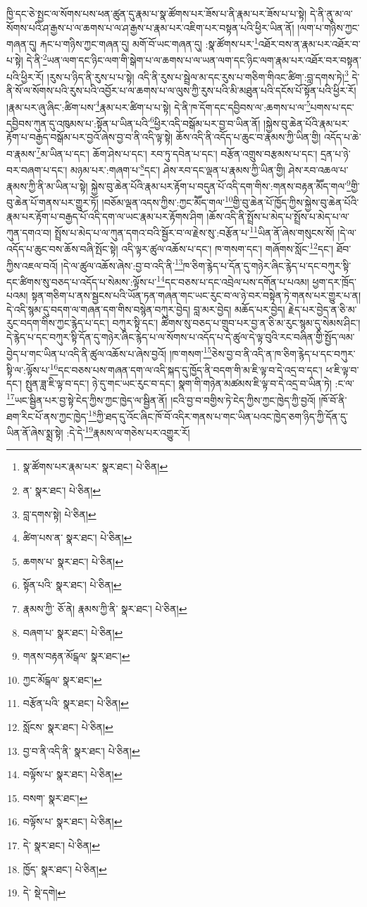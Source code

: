 ཁྱི་དང་ཅེ་སྤྱང་ལ་སོགས་པས་ཕན་ཚུན་དུ་རྣམ་པ་སྣ་ཚོགས་པར་ཟོས་པ་ནི་རྣམ་པར་ཟོས་པ་པ་སྟེ། དེ་ནི་ནུ་མ་ལ་སོགས་པའི་ཤ་རྒྱས་པ་ལ་ཆགས་པ་ལ་ཤ་རྒྱས་པ་རྣམ་པར་འཇིག་པར་བསྟན་པའི་ཕྱིར་ཡིན་ནོ། །ལག་པ་གཉིས་ཀྱང་གཞན་དུ། རྐང་པ་གཉིས་ཀྱང་གཞན་དུ། མགོ་བོ་ཡང་གཞན་དུ། :སྣ་ཚོགས་པར་\footnote{སྣ་ཚོགས་པར་རྣམ་པར་  སྣར་ཐང་།  པེ་ཅིན། }འཐོར་བས་ན་རྣམ་པར་འཐོར་བ་པ་སྟེ། དེ་ནི་\footnote{ན་  སྣར་ཐང་།  པེ་ཅིན། }ཡན་ལག་དང་ཉིང་ལག་གི་སྒེག་པ་ལ་ཆགས་པ་ལ་ཡན་ལག་དང་ཉིང་ལག་རྣམ་པར་འཐོར་བར་བསྟན་པའི་ཕྱིར་རོ། །རུས་པ་ཉིད་ནི་རུས་པ་པ་སྟེ། འདི་ནི་རུས་པ་སྦྲེལ་མ་དང་རུས་པ་གཅིག་གིའང་ཚིག་:བླ་དགས་ཏེ།\footnote{བླ་དགས་སྟེ།  པེ་ཅིན། } དེ་ནི་སོ་ལ་སོགས་པའི་རུས་པའི་འབྱོར་པ་ལ་ཆགས་པ་ལ་ལུས་ཀྱི་རུས་པའི་མི་མཐུན་པའི་དངོས་པོ་སྟོན་པའི་ཕྱིར་རོ། །རྣམ་པར་ཞུ་ཞིང་:ཚིག་པས་\footnote{ཚིག་པས་ན་  སྣར་ཐང་།  པེ་ཅིན། }རྣམ་པར་ཚིག་པ་པ་སྟེ། དེ་ནི་ཁ་དོག་དང་དབྱིབས་ལ་:ཆགས་པ་ལ་\footnote{ཆགས་པ་  སྣར་ཐང་།  པེ་ཅིན། }པགས་པ་དང་དབྱིབས་ཀུན་དུ་འཁུམས་པ་:སྟོན་པ་ཡིན་པའི་\footnote{སྟོན་པའི་  སྣར་ཐང་།  པེ་ཅིན། }ཕྱིར་འདི་བསྒོམ་པར་བྱ་བ་ཡིན་ནོ། །སྐྱེས་བུ་ཆེན་པོའི་རྣམ་པར་རྟོག་པ་བརྒྱད་བསྒོམ་པར་བྱའོ་ཞེས་བྱ་བ་ནི་འདི་ལྟ་སྟེ། ཆོས་འདི་ནི་འདོད་པ་ཆུང་བ་རྣམས་ཀྱི་ཡིན་གྱི། འདོད་པ་ཆེ་བ་རྣམས་\footnote{རྣམས་ཀྱི་  ཅོ་ནེ། རྣམས་ཀྱི་ནི་  སྣར་ཐང་།  པེ་ཅིན། }མ་ཡིན་པ་དང་། ཆོག་ཤེས་པ་དང་། རབ་ཏུ་དབེན་པ་དང་། བརྩོན་འགྲུས་བརྩམས་པ་དང་། དྲན་པ་ཉེ་བར་བཞག་པ་དང་། མཉམ་པར་:གཞག་པ་\footnote{བཞག་པ་  སྣར་ཐང་།  པེ་ཅིན། }དང་། ཤེས་རབ་དང་ལྡན་པ་རྣམས་ཀྱི་ཡིན་གྱི། ཤེས་རབ་འཆལ་པ་རྣམས་ཀྱི་ནི་མ་ཡིན་པ་སྟེ། སྐྱེས་བུ་ཆེན་པོའི་རྣམ་པར་རྟོག་པ་བདུན་པོ་འདི་དག་གིས་:གནས་བརྟན་མཽད་གལ་\footnote{གནས་བརྟན་མོངྒལ་  སྣར་ཐང་། }གྱི་བུ་ཆེན་པོ་གནས་པར་གྱུར་ཏོ། །བཅོམ་ལྡན་འདས་ཀྱིས་:ཀྱང་མཽད་གལ་\footnote{ཀྱང་མོངྒལ་  སྣར་ཐང་། }གྱི་བུ་ཆེན་པོ་ཁྱོད་ཀྱིས་སྐྱེས་བུ་ཆེན་པོའི་རྣམ་པར་རྟོག་པ་བརྒྱད་པོ་འདི་དག་ལ་ཡང་རྣམ་པར་རྟོགས་ཤིག །ཆོས་འདི་ནི་སྤྲོས་པ་མེད་པ་སྤྲོས་པ་མེད་པ་ལ་ཀུན་དགའ་བ། སྤྲོས་པ་མེད་པ་ལ་ཀུན་དགའ་བའི་སྦྱོར་བ་ལ་རྗེས་སུ་:བརྩོན་པ་\footnote{བརྩོན་པའི་  སྣར་ཐང་།  པེ་ཅིན། }ཡིན་ནོ་ཞེས་གསུངས་སོ། །དེ་ལ་འདོད་པ་ཆུང་བས་ཆོས་བཞི་སྤོང་སྟེ། འདི་ལྟར་ཚུལ་འཆོས་པ་དང་། ཁ་གསག་དང་། གཞོགས་སློང་\footnote{སློངས་  སྣར་ཐང་།  པེ་ཅིན། }དང་། ཐོབ་ཀྱིས་འཇལ་བའོ། །དེ་ལ་ཚུལ་འཆོས་ཞེས་:བྱ་བ་འདི་ནི་\footnote{བྱ་བ་ནི་འདི་ནི་  སྣར་ཐང་།  པེ་ཅིན། }ཁ་ཅིག་རྙེད་པ་དོན་དུ་གཉེར་ཞིང་རྙེད་པ་དང་བཀུར་སྟི་དང་ཚིགས་སུ་བཅད་པ་འདོད་པ་སེམས་:ལྟོས་པ་\footnote{བལྟོས་པ་  སྣར་ཐང་།  པེ་ཅིན། }དང་བཅས་པ་དང་འབྲེལ་པས་དགོན་པ་པའམ། ཕྱག་དར་ཁྲོད་པའམ། སྟན་གཅིག་པ་ནས་སྦྱངས་པའི་ཡོན་ཏན་གཞན་གང་ཡང་རུང་བ་ལ་ཉེ་བར་བསྟེན་ཏེ་གནས་པར་གྱུར་པ་ན། དེ་འདི་སྙམ་དུ་བདག་ལ་གཞན་དག་གིས་བསྙེན་བཀུར་བྱེད། བླ་མར་བྱེད། མཆོད་པར་བྱེད། རྗེད་པར་བྱེད་ན་ཅི་མ་རུང་བདག་གིས་ཀྱང་རྙེད་པ་དང་། བཀུར་སྟི་དང་། ཚིགས་སུ་བཅད་པ་གྲུབ་པར་བྱ་ན་ཅི་མ་རུང་སྙམ་དུ་སེམས་ཤིང་། དེ་རྙེད་པ་དང་བཀུར་སྟི་དོན་དུ་གཉེར་ཞིང་རྙེད་པ་ལ་སོགས་པ་འདོད་པ་དེ་ཚུལ་དེ་ལྟ་བུའི་རང་བཞིན་གྱི་སྤྱོད་ལམ་བྱེད་པ་གང་ཡིན་པ་འདི་ནི་ཚུལ་འཆོས་པ་ཞེས་བྱའོ། །ཁ་གསག་\footnote{བསག་  སྣར་ཐང་། }ཅེས་བྱ་བ་ནི་འདི་ན་ཁ་ཅིག་རྙེད་པ་དང་བཀུར་སྟི་ལ་:ལྟོས་པ་\footnote{བལྟོས་པ་  སྣར་ཐང་།  པེ་ཅིན། }དང་བཅས་པས་གཞན་དག་ལ་འདི་སྐད་དུ་ཁྱོད་ནི་བདག་གི་མ་ཇི་ལྟ་བ་དེ་འདྲ་བ་དང་། ཕ་ཇི་ལྟ་བ་དང་། སྤུན་ཟླ་ཇི་ལྟ་བ་དང་། ཉེ་དུ་གང་ཡང་རུང་བ་དང་། སྣག་གི་གཉེན་མཚམས་ཇི་ལྟ་བ་དེ་འདྲ་བ་ཡིན་ཏེ། :ང་ལ་\footnote{དེ་  སྣར་ཐང་།  པེ་ཅིན། }ཡང་སྦྱིན་པར་བྱ་སྟེ་ངེད་ཀྱིས་ཀྱང་ཁྱེད་ལ་སྦྱིན་ནོ། །ངའི་བྱ་བ་བགྱིས་ཏེ་ངེད་ཀྱིས་ཀྱང་ཁྱེད་ཀྱི་བྱའོ། །ཁོ་བོ་ནི་ཐག་རིང་པོ་ནས་ཀྱང་ཁྱེད་\footnote{ཁྱོད་  སྣར་ཐང་།  པེ་ཅིན། }ཀྱི་ཐད་དུ་འོང་ཞིང་ཁོ་བོ་འདིར་གནས་པ་གང་ཡིན་པའང་ཁྱེད་ཅག་ཉིད་ཀྱི་དོན་དུ་ཡིན་ནོ་ཞེས་སྨྲ་སྟེ། :དེ་དེ་\footnote{དེ་  སྡེ་དགེ། }རྣམས་ལ་གཅེས་པར་འགྱུར་རོ། 